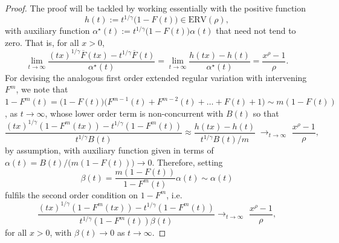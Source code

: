 \documentclass[11pt, a4paper, oneside]{article}
\numberwithin{equation}{section}
\theoremstyle{plain}
\theoremstyle{definition}
\newcommand{\arrowf}[1]{\ensuremath{\displaystyle {\mathop {\longrightarrow}_{#1 \rightarrow \infty}\,}}}
\newcommand{\limit}[1]{\ensuremath{\displaystyle {\lim_{#1 \rightarrow{\infty}}}}}
\begin{document}
\begin{proof}
The proof will be tackled by working essentially with the positive function
\begin{equation*}
	h(t) := t^{1/\gamma} \bigl( 1-F(t)\bigr) \in \textrm{ERV}(\rho), 
\end{equation*}
with auxiliary function $\alpha^{\star}(t):= t^{1/\gamma} \bigl( 1-F(t)\bigr) \alpha(t)$ that need not tend to zero. That is, for all $x>0$,
\begin{equation*}
	\limit{t}\frac{(tx)^{1/\gamma}\overline{F}(tx) - t^{1/\gamma}\overline{F}(t)}{\alpha^{\star}(t)} = \limit{t}\frac{h(tx) - h(t)}{\alpha^{\star}(t)} = \frac{x^{\rho}-1}{\rho}.
\end{equation*}
For devising the analogous first order extended regular variation \citep[cf.][App. B2]{deHaanFerreira2006} with intervening $F^m$, we note that $1-F^m(t)= \bigl(1-F(t)\bigr) \bigl( F^{m-1}(t) + F^{m-2}(t) + \ldots + F(t) + 1\bigr) \sim m(1-F(t))$, as $t \rightarrow \infty$, whose lower order term is non-concurrent with $B(t)$ so that
\begin{equation*}
	\frac{(tx)^{1/\gamma}(1-F^m(tx)) - t^{1/\gamma}(1-F^m(t))}{t^{1/\gamma}B(t)} \approx \frac{h(tx) - h(t)}{t^{1/\gamma}B(t)/m} \;\arrowf{t}\, \frac{x^\rho-1}{\rho}, 
\end{equation*}
by assumption, with auxiliary function given in terms of $\alpha(t)= B(t)/\bigl(m (1-F(t))\bigr) \rightarrow 0$. Therefore, setting
\begin{equation*}
	\beta(t) = \frac{m (1-F(t)) }{1-F^m(t)}\alpha(t) \sim \alpha(t) 
\end{equation*}
fulfils the second order condition on $1-F^m$, i.e.
\begin{equation*}
	\frac{(tx)^{1/\gamma}(1-F^m(tx)) - t^{1/\gamma}(1-F^m(t))}{t^{1/\gamma}(1-F^m(t)) \beta(t)} \arrowf{t}\, \frac{x^\rho-1}{\rho}, 
\end{equation*}
for all $x>0$, with $\beta(t) \rightarrow 0$ as $t\rightarrow \infty$.
\end{proof}



\end{document}
